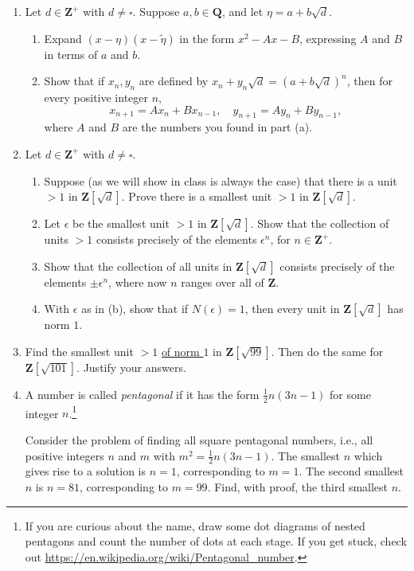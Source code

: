 \documentclass[12pt]{article}
\def\Z{\mathbf{Z}}
\def\Q{\mathbf{Q}}
\newcommand{\leg}[2]{\genfrac{(}{)}{}{}{#1}{#2}}
\begin{document}
\begin{enumerate}
\item Let $d \in \Z^{+}$ with $d\ne \square$. Suppose $a, b \in \Q$, and let $\eta = a+b\sqrt{d}$.
\begin{enumerate}
\item Expand $(x-\eta)(x-\tilde{\eta})$ in the form $x^2-Ax-B$, expressing $A$ and $B$ in terms of $a$ and $b$.
\item Show that if $x_n, y_n$ are defined by $x_n + y_n\sqrt{d} = (a+b\sqrt{d})^n$, then for every positive integer $n$,
\[ x_{n+1} = Ax_n + Bx_{n-1}, \quad y_{n+1} = Ay_n + By_{n-1}, \]
where $A$ and $B$ are the numbers you found in part (a).
\end{enumerate}

\item Let $d\in\Z^{+}$ with $d\ne \square$.
\begin{enumerate}
\item Suppose (as we will show in class is always the case) that there is a unit $>1$ in $\Z[\sqrt{d}]$. Prove there is a smallest unit $>1$ in $\Z[\sqrt{d}]$. 
\item Let $\epsilon$ be the smallest unit $>1$ in $\Z[\sqrt{d}]$. Show that the collection of units $> 1$ consists precisely of the elements $\epsilon^n$, for $n\in \Z^{+}$.
\item Show that the collection of all units in $\Z[\sqrt{d}]$ consists precisely of the elements $\pm \epsilon^n$, where now $n$ ranges over all of $\Z$.
\item With $\epsilon$ as in (b), show that if $N(\epsilon)=1$, then every unit in $\Z[\sqrt{d}]$ has norm $1$.
\end{enumerate}

\item Find the smallest unit $>1$ \underline{of norm $1$} in $\Z[\sqrt{99}]$. Then do the same for $\Z[\sqrt{101}]$. Justify your answers.

\item A number is called \emph{pentagonal} if it has the form $\frac{1}{2}n(3n-1)$ for some integer $n$.\footnote{If you are curious about the name, draw some dot diagrams of nested pentagons and count the number of dots at each stage. If you get stuck, check out \url{https://en.wikipedia.org/wiki/Pentagonal_number}.}

Consider the problem of finding all square pentagonal numbers, i.e., all positive integers $n$ and $m$ with $m^2 = \frac{1}{2}n(3n-1)$. The smallest $n$ which gives rise to a solution is $n=1$, corresponding to $m=1$. The second smallest $n$ is $n=81$, corresponding to $m=99$. Find, with proof, the third smallest $n$.



\end{enumerate}
\end{document}
